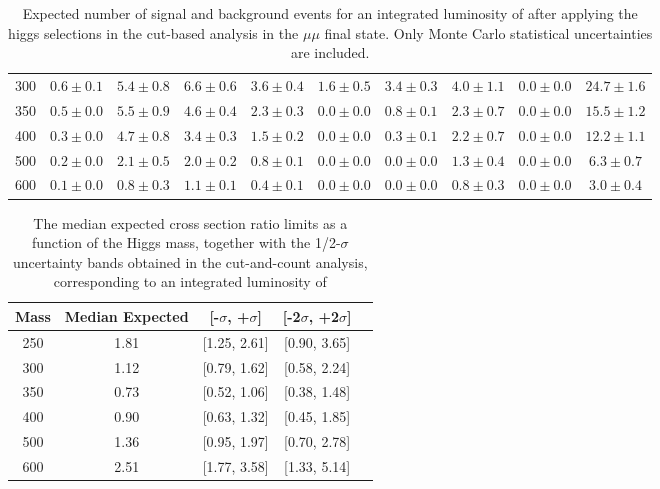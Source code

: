 \begin{table}
{\begin{center}
\begin{tabular}{l | c c |  c c c c c c c }
300 & $0.6\pm0.1$ & $5.4\pm0.8$ & $6.6\pm0.6$ & $3.6\pm0.4$ & $1.6\pm0.5$ & $3.4\pm0.3$ & $4.0\pm1.1$ & $0.0\pm0.0$ & $24.7\pm1.6$ \\ %
350 & $0.5\pm0.0$ & $5.5\pm0.9$ & $4.6\pm0.4$ & $2.3\pm0.3$ & $0.0\pm0.0$ & $0.8\pm0.1$ & $2.3\pm0.7$ & $0.0\pm0.0$ & $15.5\pm1.2$ \\ %
400 & $0.3\pm0.0$ & $4.7\pm0.8$ & $3.4\pm0.3$ & $1.5\pm0.2$ & $0.0\pm0.0$ & $0.3\pm0.1$ & $2.2\pm0.7$ & $0.0\pm0.0$ & $12.2\pm1.1$ \\ %
500 & $0.2\pm0.0$ & $2.1\pm0.5$ & $2.0\pm0.2$ & $0.8\pm0.1$ & $0.0\pm0.0$ & $0.0\pm0.0$ & $1.3\pm0.4$ & $0.0\pm0.0$ & $6.3\pm0.7$ \\ %
600 & $0.1\pm0.0$ & $0.8\pm0.3$ & $1.1\pm0.1$ & $0.4\pm0.1$ & $0.0\pm0.0$ & $0.0\pm0.0$ & $0.8\pm0.3$ & $0.0\pm0.0$ & $3.0\pm0.4$ \\ %
\hline
\end{tabular}
\label{tab:yield_cutbased_mm}
\end{center}
}
\caption{Expected number of signal and background events for an 
  integrated luminosity of \intlumi after applying the higgs selections in the cut-based analysis in the $\mu\mu$ final state. 
  Only Monte Carlo statistical uncertainties are included. }
\end{table}

\begin{table}
\begin{center}
\begin{tabular}{ccccc}
\hline
 Mass & Median Expected & [-$\sigma$, +$\sigma$] & [-2$\sigma$, +2$\sigma$]\\\hline
 250 & 1.81 & [1.25, 2.61] & [0.90, 3.65] \\
300 & 1.12 & [0.79, 1.62] & [0.58, 2.24] \\
350 & 0.73 & [0.52, 1.06] & [0.38, 1.48] \\
400 & 0.90 & [0.63, 1.32] & [0.45, 1.85] \\
500 & 1.36 & [0.95, 1.97] & [0.70, 2.78] \\
600 & 2.51 & [1.77, 3.58] & [1.33, 5.14] \\
\hline
\end{tabular}
\end{center}
\label{tab:limits_cutbased_2fb}
\caption{\fixme The median expected cross section ratio limits as a function 
of the Higgs mass, together with the 1/2-$\sigma$ uncertainty bands obtained in the cut-and-count analysis, corresponding to 
an integrated luminosity of \intlumi}
\end{table}



